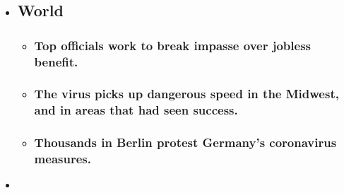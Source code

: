 \begin{itemize}
\item
  \href{https://www.nytimes.com/2020/08/01/world/coronavirus-covid-19.html?type=styln-live-updates\&label=world\&index=0}{}

  \hypertarget{world}{%
  \subsection{World}\label{world}}

  \begin{itemize}
  \item
    \href{https://www.nytimes.com/2020/08/01/world/coronavirus-covid-19.html?type=styln-live-updates\&label=world\&index=0\#link-3ac56579}{}

    \hypertarget{top-officials-work-to-break-impasse-over-jobless-benefit}{%
    \subsubsection{Top officials work to break impasse over jobless
    benefit.}\label{top-officials-work-to-break-impasse-over-jobless-benefit}}
  \item
    \href{https://www.nytimes.com/2020/08/01/world/coronavirus-covid-19.html?type=styln-live-updates\&label=world\&index=0\#link-8796723}{}

    \hypertarget{the-virus-picks-up-dangerous-speed-in-the-midwest-and-in-areas-that-had-seen-success}{%
    \subsubsection{The virus picks up dangerous speed in the Midwest,
    and in areas that had seen
    success.}\label{the-virus-picks-up-dangerous-speed-in-the-midwest-and-in-areas-that-had-seen-success}}
  \item
    \href{https://www.nytimes.com/2020/08/01/world/coronavirus-covid-19.html?type=styln-live-updates\&label=world\&index=0\#link-25930521}{}

    \hypertarget{thousands-in-berlin-protest-germanys-coronavirus-measures}{%
    \subsubsection{Thousands in Berlin protest Germany's coronavirus
    measures.}\label{thousands-in-berlin-protest-germanys-coronavirus-measures}}
  \end{itemize}
\item
  \href{https://www.nytimes.com/live/2020/07/31/business/stock-market-today-coronavirus?type=styln-live-updates\&label=business\&index=1}{}


\end{itemize}
